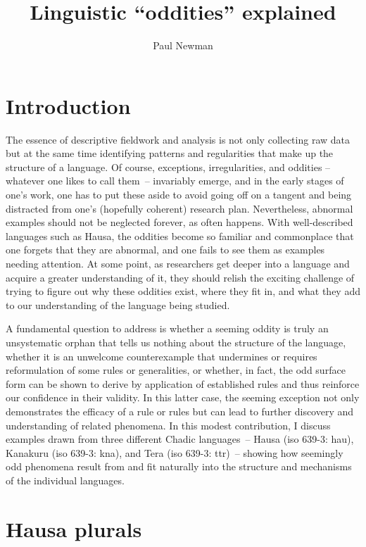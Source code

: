 \documentclass[output=paper,colorlinks,citecolor=brown]{langscibook}
\author{Paul Newman\affiliation{Indiana University}}
\title{Linguistic ``oddities'' explained}
\begin{document}
\maketitle

\section{Introduction}
 The essence of descriptive fieldwork and analysis is not only collecting raw data but at the same time identifying patterns and regularities that make up the structure of a language. Of course, exceptions, irregularities, and oddities – whatever one likes to call them~-- invariably emerge, and in the early stages of one’s work, one has to put these aside to avoid going off on a tangent and being distracted from one’s (hopefully coherent) research plan. Nevertheless, abnormal examples should not be neglected forever, as often happens. With well-described languages such as Hausa, the oddities become so familiar and commonplace that one forgets that they are abnormal, and one fails to see them as examples needing attention. At some point, as researchers get deeper into a language and acquire a greater understanding of it, they should relish the exciting challenge of trying to figure out why these oddities exist, where they fit in, and what they add to our understanding of the language being studied.

 A fundamental question to address is whether a seeming oddity is truly an unsystematic orphan that tells us nothing about the structure of the language, whether it is an unwelcome counterexample that undermines or requires reformulation of some rules or generalities, or whether, in fact, the odd surface form can be shown to derive by application of established rules and thus reinforce our confidence in their validity. In this latter case, the seeming exception not only demonstrates the efficacy of a rule or rules but can lead to further discovery and understanding of related phenomena. In this modest contribution, I discuss examples drawn from three different Chadic languages~-- Hausa (iso 639-3: hau), Kanakuru (iso 639-3: kna), and Tera (iso 639-3: ttr)~-- showing how seemingly odd phenomena result from and fit naturally into the structure and mechanisms of the individual languages.

 \section{Hausa plurals}
\end{document}
